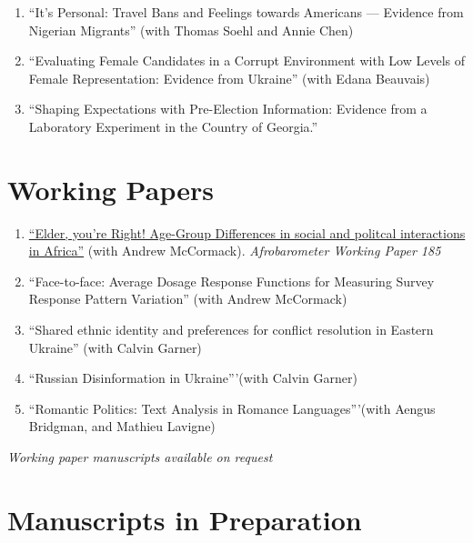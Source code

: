 \documentclass[margin,line]{res}
\begin{document}
{\begin{resume}
\begin{enumerate}
\item  ``It's Personal: Travel Bans and Feelings towards Americans ---
  Evidence from Nigerian Migrants'' (with Thomas Soehl and Annie Chen)
  
\item ``Evaluating Female Candidates in a Corrupt Environment with Low
Levels of Female Representation: Evidence from Ukraine'' (with Edana Beauvais)

\item ``Shaping Expectations with Pre-Election Information:
Evidence from a Laboratory Experiment in the Country of Georgia.''

\end{enumerate}


\section{\sc Working Papers}
\renewcommand{\labelenumi}{WP\theenumi.}

\begin{enumerate}


\item \href{http://afrobarometer.org/publications/wp185-age-group-differences-social-and-political-interactions-africa}{``Elder, you're Right! Age-Group Differences in social and
  politcal interactions in
  Africa''} (with Andrew McCormack). \textit{Afrobarometer Working
  Paper 185}
  
 \item ``Face-to-face: Average Dosage Response Functions for
    Measuring Survey Response Pattern Variation'' (with Andrew McCormack)

\item ``Shared ethnic identity and preferences for conflict resolution in
Eastern Ukraine'' (with Calvin Garner)

\item ``Russian Disinformation in Ukraine'''(with Calvin Garner)
  
\item ``Romantic Politics: Text Analysis in Romance Languages'''(with Aengus Bridgman, and Mathieu Lavigne)


\end{enumerate}
\centerline{\emph{Working paper manuscripts available on request}}


\section{\sc Manuscripts in Preparation}
\renewcommand{\labelenumi}{MP\theenumi.}


\end{resume}}
\end{document}
